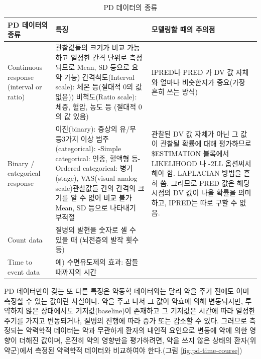 \documentclass[
  11pt,
  krantz2, a4paper, twoside]{krantz}
\theoremstyle{definition}
\theoremstyle{definition}
\theoremstyle{definition}
\theoremstyle{remark}
\begin{document}
\begin{table}

\caption{\label{tab:pd-data-property}PD 데이터의 종류}
\centering
\begin{tabular}[t]{>{\raggedright\arraybackslash}p{3.0cm}>{\raggedright\arraybackslash}p{5.5cm}>{\raggedright\arraybackslash}p{4.5cm}}
\toprule
PD 데이터의 종류 & 특징 & 모델링할 때의 주의점\\
\midrule
Continuous response (interval or ratio) & 관찰값들의 크기가 비교 가능하고 일정한 간격 단위로 측정되므로 Mean, SD 등으로 요약 가능\newline 1) 간격척도(Interval scale): 체온 등(절대적 0의 값 없음)\newline 2) 비척도(Ratio scale): 체중, 혈압, 농도 등 (절대적 0의 값 있음) & IPRED나 PRED 가 DV 값 자체와 얼마나 비슷한지가 중요(가장 흔히 쓰는 방식)\\
Binary / categorical response & 이진(binary): 증상의 유/무 등\newline 3가지 이상 범주(categorical): \newline -Simple categorical: 인종, 혈액형 등\newline -Ordered categorical: 병기(stage), VAS(visual analog scale)\newline 관찰값들 간의 간격의 크기를 알 수 없어 비교 불가\newline Mean, SD 등으로 나타내기 부적절 & 관찰된 DV 값 자체가 아닌 그 값이 관찰될 확률에 대해 평가하므로 \$ESTIMATION 블록에서 LIKELIHOOD 나 -2LL 옵션써서 해야 함. LAPLACIAN 방법을 흔히 씀. 그러므로 PRED 값은 해당 시점의 DV 값이 나올 확률을 의미하고, IPRED는 따로 구할 수 없음.\\
Count data & 질병의 발현을 숫자로 셀 수 있을 때 (뇌전증의 발작 횟수 등) & \\
Time to event data & 예) 수면유도제의 효과: 잠들 때까지의 시간 & \\
\bottomrule
\end{tabular}
\end{table}

PD 데이터만이 갖는 또 다른 특징은 약동학 데이터와는 달리 약을 주기 전에도 이미 측정할 수 있는 값이란 사실이다. 약을 주고 나서 그 값이 약효에 의해 변동되지만, 투약하지 않은 상태에서도 기저값(baseline)이 존재하고 그 기저값은 시간에 따라 일정한 주기를 가지고 변동되거나, 질병의 진행에 따라 증가 또는 감소할 수 있다. 그러므로 측정되는 약력학적 데이터는 약과 무관하게 환자의 내인적 요인으로 변동에 약에 의한 영향이 더해진 값이며, 온전히 약의 영향만을 평가하려면, 약을 쓰지 않은 상태의 환자(위약군)에서 측정된 약력학적 데이터와 비교하여야 한다.(그림 \ref{fig:pd-time-course})
\end{document}
